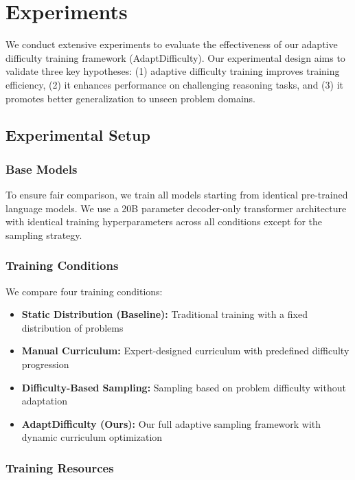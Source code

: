 \section{Experiments}
\label{sec:experiments}

We conduct extensive experiments to evaluate the effectiveness of our adaptive difficulty training framework (AdaptDifficulty). Our experimental design aims to validate three key hypotheses: (1) adaptive difficulty training improves training efficiency, (2) it enhances performance on challenging reasoning tasks, and (3) it promotes better generalization to unseen problem domains.

\subsection{Experimental Setup}

\subsubsection{Base Models}

To ensure fair comparison, we train all models starting from identical pre-trained language models. We use a 20B parameter decoder-only transformer architecture with identical training hyperparameters across all conditions except for the sampling strategy.

\subsubsection{Training Conditions}

We compare four training conditions:

\begin{itemize}
    \item \textbf{Static Distribution (Baseline):} Traditional training with a fixed distribution of problems
    \item \textbf{Manual Curriculum:} Expert-designed curriculum with predefined difficulty progression
    \item \textbf{Difficulty-Based Sampling:} Sampling based on problem difficulty without adaptation
    \item \textbf{AdaptDifficulty (Ours):} Our full adaptive sampling framework with dynamic curriculum optimization
\end{itemize}

\subsubsection{Training Resources}


